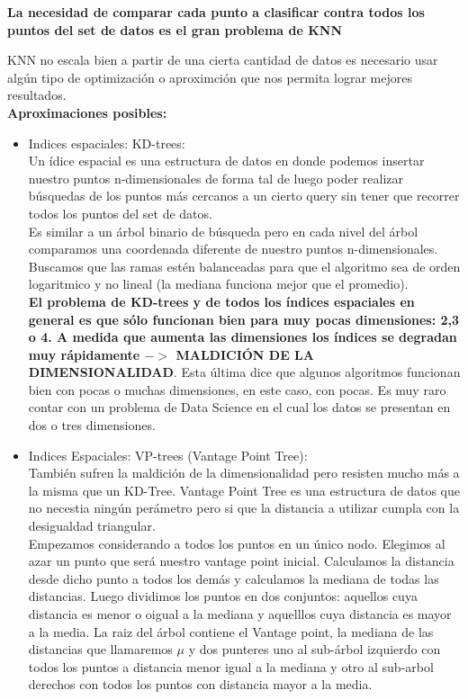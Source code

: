 \documentclass[titlepage,a4paper]{article}
\begin{document}
\textbf{La necesidad de comparar cada punto a clasificar contra todos los puntos del set de datos es el gran problema de KNN}

KNN no escala bien a partir de una cierta cantidad de datos es necesario usar algún tipo de optimización o aproximción que nos permita lograr mejores resultados. \\

\textbf{Aproximaciones posibles:}
\begin{itemize}
\item Indices espaciales: KD-trees: \\

Un ídice espacial es una estructura de datos en donde podemos insertar nuestro puntos n-dimensionales de forma tal de luego poder realizar búsquedas de los puntos más cercanos a un cierto query sin tener que recorrer todos los puntos del set de datos. \\

Es similar  a un árbol binario de búsqueda pero en cada nivel del árbol comparamos una coordenada diferente de nuestro puntos n-dimensionales. Buscamos que las ramas estén balanceadas para que el algoritmo sea de orden logaritmico y no lineal (la mediana funciona mejor que el promedio). \\

\textbf{El problema de KD-trees y de todos los índices espaciales en general es que sólo funcionan bien para muy pocas dimensiones: 2,3 o 4. A medida que aumenta las dimensiones los índices se degradan muy rápidamente $->$ MALDICIÓN DE LA DIMENSIONALIDAD}. Esta última dice que algunos algoritmos funcionan bien con pocas o  muchas dimensiones, en este caso, con pocas. Es muy raro contar con un problema de Data Science en el cual los datos se presentan en dos o tres dimensiones.\\

\item Indices Espaciales: VP-trees (Vantage Point Tree): \\

También sufren la maldición de la dimensionalidad pero resisten mucho más a la misma que un KD-Tree. Vantage Point Tree es una estructura de datos que no necestia ningún perámetro pero si que la distancia a utilizar cumpla con la desigualdad triangular. \\

Empezamos considerando a todos los puntos en un único nodo. Elegimos al azar un punto que será nuestro vantage point inicial. Calculamos la distancia desde dicho punto a todos los demás y calculamos la mediana de todas las distancias. Luego dividimos los puntos en dos conjuntos: aquellos cuya distancia es menor o oigual a la mediana y aquelllos cuya distancia es mayor a la media. La raiz del árbol contiene el Vantage point, la mediana de las distancias que llamaremos $\mu$ y dos punteres uno al sub-árbol izquierdo con todos los puntos a distancia menor igual a la mediana y otro al sub-arbol derechos con todos los puntos con distancia mayor a la media. \\


\end{itemize}
\end{document}
